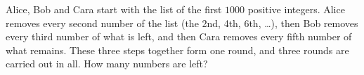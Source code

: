 Alice, Bob and Cara start with the list of the first $1000$ positive integers. Alice removes every second number of the list (the 2nd, 4th, 6th, \dots), then Bob removes every third number of what is left, and then Cara removes every fifth number of what remains. These three steps together form one round, and three rounds are carried out in all. How many numbers are left?
